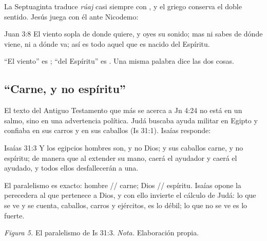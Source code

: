 La Septuaginta traduce \emph{rúaj} casi siempre con , y el griego conserva el doble sentido. Jesús juega con él ante Nicodemo:

\begin{verso}{Juan 3:8}
El viento sopla de donde quiere, y oyes su sonido; mas ni sabes de dónde viene, ni a dónde va; así es todo aquel que es nacido del Espíritu.
\end{verso}

``El viento'' es ; ``del Espíritu'' es . Una misma palabra dice las dos cosas.


\subsection{“Carne, y no espíritu”}

El texto del Antiguo Testamento que más se acerca a Jn 4:24 no está en un salmo, sino en una advertencia política. Judá buscaba ayuda militar en Egipto y confiaba en sus carros y en sus caballos (Is 31:1). Isaías responde:

\begin{verso}{Isaías 31:3}
Y los egipcios hombres son, y no Dios; y sus caballos carne, y no espíritu; de manera que al extender \SENOR{} su mano, caerá el ayudador y caerá el ayudado, y todos ellos desfallecerán a una.
\end{verso}

El paralelismo es exacto: hombre // carne; Dios // espíritu. Isaías opone la  perecedera al  que pertenece a Dios, y con ello invierte el cálculo de Judá: lo que se ve y se cuenta, caballos, carros y ejércitos, es lo débil; lo que no se ve es lo fuerte.

\begin{center}
\par
{\footnotesize\color{gris}\textit{Figura 5.} El paralelismo de Is 31:3. \textit{Nota.} Elaboración propia.}
\end{center}

